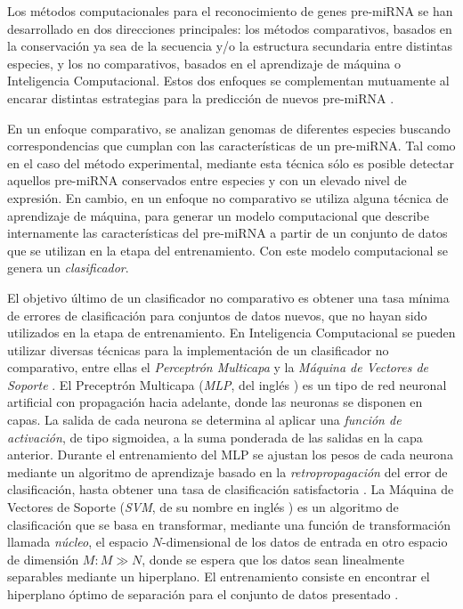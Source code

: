 \documentclass[12pt,bibliography=oldstyle,DIV=12,parskip=half-]{scrreprt}
\begin{document}
Los métodos computacionales para el reconocimiento de genes pre-miRNA se
han desarrollado en dos direcciones principales: los métodos
comparativos, basados en la conservación ya sea de la secuencia y/o la
estructura secundaria entre distintas especies, y los no comparativos,
basados en el aprendizaje de máquina o Inteligencia
Computacional. Estos dos enfoques se complementan mutuamente al
encarar distintas estrategias para la predicción de nuevos pre-miRNA
\cite{batuwita}\cite{sheng}.

En un enfoque comparativo, se analizan genomas de diferentes especies
buscando correspondencias que cumplan con las características de un
pre-miRNA. Tal como en el caso del método experimental, mediante esta
técnica sólo es posible detectar aquellos pre-miRNA conservados entre
especies y con un elevado nivel de expresión. En cambio, en un enfoque
no comparativo se utiliza alguna técnica de aprendizaje de máquina,
para generar un modelo computacional que describe internamente las
características del pre-miRNA a partir de un conjunto de datos que se
utilizan en la etapa del entrenamiento. Con este modelo computacional
se genera un \emph{clasificador}.

El objetivo último de un clasificador no comparativo es obtener una
tasa mínima de errores de clasificación para conjuntos de datos
nuevos, que no hayan sido utilizados en la etapa de entrenamiento.  En
Inteligencia Computacional se pueden utilizar diversas técnicas para
la implementación de un clasificador no comparativo, entre ellas
el \emph{Perceptrón Multicapa}
\cite{mlp1}\cite{mlp2} y la \emph{Máquina de Vectores de Soporte}
\cite{svm}.  El Preceptrón Multicapa (\emph{MLP}, del inglés
) es un tipo de red neuronal artificial con
propagación hacia adelante, donde las neuronas se disponen en capas.
La salida de cada neurona se determina al aplicar una \emph{función de
  activación}, de tipo sigmoidea, a la suma ponderada de las salidas
en la capa anterior. Durante el entrenamiento del MLP se ajustan los
pesos de cada neurona mediante un algoritmo de aprendizaje basado en
la \emph{retropropagación} del error de clasificación, hasta obtener
una tasa de clasificación satisfactoria \cite{jain}.  La Máquina de
Vectores de Soporte (\emph{SVM}, de su nombre en inglés ) es un algoritmo de clasificación que se basa en
transformar, mediante una función de transformación llamada \emph{núcleo}, el
espacio $N$-dimensional de los datos de entrada en otro espacio de
dimensión $M: M\gg N$, donde se espera que los datos sean linealmente
separables mediante un hiperplano. El entrenamiento consiste en
encontrar el hiperplano óptimo de separación para el conjunto de datos
presentado \cite{bottou}.
\end{document}
